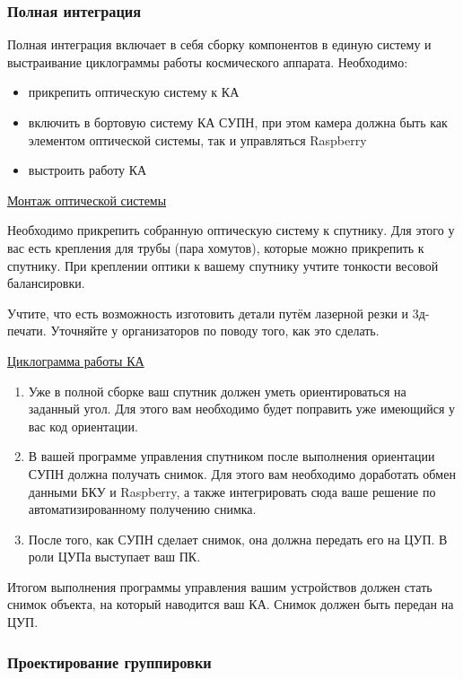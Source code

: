 \subsubsection*{Полная интеграция}

Полная интеграция включает в себя сборку компонентов в единую систему и выстраивание циклограммы работы космического аппарата. Необходимо:

\begin{itemize}
    \item прикрепить оптическую систему к КА
    \item включить в бортовую систему КА СУПН, при этом камера должна быть как элементом оптической системы, так и управляться Raspberry
    \item выстроить работу КА
\end{itemize}

\underline{Монтаж оптической системы}

Необходимо прикрепить собранную оптическую систему к спутнику. Для этого у вас есть крепления для трубы (пара хомутов), которые можно прикрепить к спутнику. При креплении оптики к вашему спутнику учтите тонкости весовой балансировки.

Учтите, что есть возможность изготовить детали путём лазерной резки и 3д-печати. Уточняйте у организаторов по поводу того, как это сделать.

\underline{Циклограмма работы КА}

\begin{enumerate}
    \item Уже в полной сборке ваш спутник должен уметь ориентироваться на заданный угол. Для этого вам необходимо будет поправить уже имеющийся у вас код ориентации.
    \item В вашей программе управления спутником после выполнения ориентации СУПН должна получать снимок. Для этого вам необходимо доработать обмен данными БКУ и Raspberry, а также интегрировать сюда ваше решение по автоматизированному получению снимка.
    \item После того, как СУПН сделает снимок, она должна передать его на ЦУП. В роли ЦУПа выступает ваш ПК.
\end{enumerate} 

Итогом выполнения программы управления вашим устройствов должен стать снимок объекта, на который наводится ваш КА. Снимок должен быть передан на ЦУП.

\subsubsection*{Проектирование группировки}

